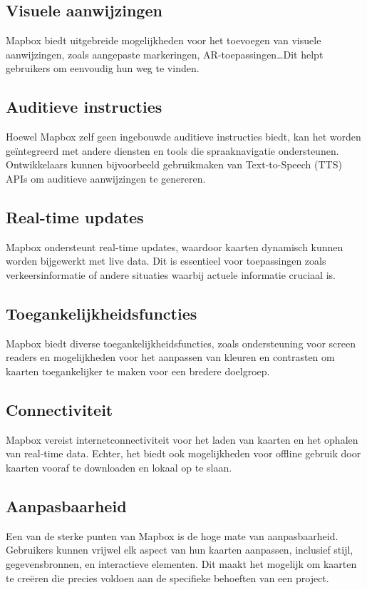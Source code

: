 \subsection*{Visuele aanwijzingen}
Mapbox biedt uitgebreide mogelijkheden voor het toevoegen van visuele aanwijzingen, zoals aangepaste markeringen, AR-toepassingen\ldots Dit helpt gebruikers om eenvoudig hun weg te vinden.

\subsection*{Auditieve instructies}
Hoewel Mapbox zelf geen ingebouwde auditieve instructies biedt, kan het worden geïntegreerd met andere diensten en tools die spraaknavigatie ondersteunen. Ontwikkelaars kunnen bijvoorbeeld gebruikmaken van Text-to-Speech (TTS) APIs om auditieve aanwijzingen te genereren.

\subsection*{Real-time updates}
Mapbox ondersteunt real-time updates, waardoor kaarten dynamisch kunnen worden bijgewerkt met live data. Dit is essentieel voor toepassingen zoals verkeersinformatie of andere situaties waarbij actuele informatie cruciaal is.

\subsection*{Toegankelijkheidsfuncties}
Mapbox biedt diverse toegankelijkheidsfuncties, zoals ondersteuning voor screen readers en mogelijkheden voor het aanpassen van kleuren en contrasten om kaarten toegankelijker te maken voor een bredere doelgroep. 

\subsection*{Connectiviteit}
Mapbox vereist internetconnectiviteit voor het laden van kaarten en het ophalen van real-time data. Echter, het biedt ook mogelijkheden voor offline gebruik door kaarten vooraf te downloaden en lokaal op te slaan.

\subsection*{Aanpasbaarheid}
Een van de sterke punten van Mapbox is de hoge mate van aanpasbaarheid. Gebruikers kunnen vrijwel elk aspect van hun kaarten aanpassen, inclusief stijl, gegevensbronnen, en interactieve elementen. Dit maakt het mogelijk om kaarten te creëren die precies voldoen aan de specifieke behoeften van een project.

